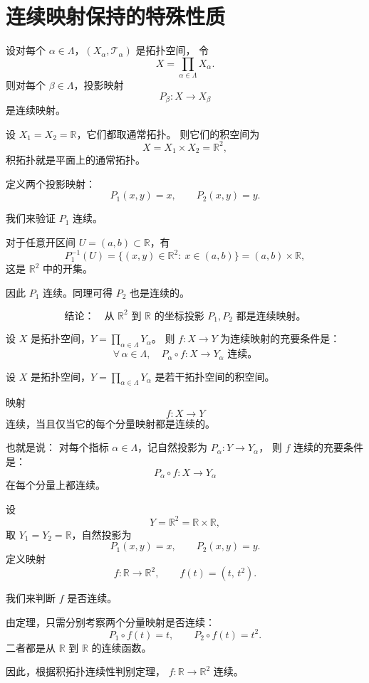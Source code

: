 \section{连续映射保持的特殊性质}
\begin{theorem}[积拓扑中的自然投影映射是连续的]
设对每个 \(\alpha\in\Lambda\)，\((X_\alpha,\mathcal{T}_\alpha)\) 是拓扑空间，
令
\[
X=\prod_{\alpha\in\Lambda}X_\alpha.
\]
则对每个 \(\beta\in\Lambda\)，投影映射
\[
P_\beta:X\to X_\beta
\]
是连续映射。
\end{theorem}
\begin{example}[投影映射的连续性举例]
设 \(X_1=X_2=\mathbb{R}\)，它们都取通常拓扑。  
则它们的积空间为
\[
X = X_1 \times X_2 = \mathbb{R}^2,
\]
积拓扑就是平面上的通常拓扑。

定义两个投影映射：
\[
P_1(x,y)=x,\qquad P_2(x,y)=y.
\]

我们来验证 \(P_1\) 连续。

对于任意开区间 \(U=(a,b)\subset\mathbb{R}\)，有
\[
P_1^{-1}(U)=\{(x,y)\in\mathbb{R}^2:\ x\in(a,b)\}=(a,b)\times\mathbb{R},
\]
这是 \(\mathbb{R}^2\) 中的开集。

因此 \(P_1\) 连续。同理可得 \(P_2\) 也是连续的。

\[
\boxed{\text{结论：}}\quad
\text{从 }\mathbb{R}^2\text{ 到 }\mathbb{R}\text{ 的坐标投影 }P_1,P_2\text{ 都是连续映射。}
\]
\end{example}
\begin{theorem}[积为连续的充要条件就是每一个分量都连续]
设 \(X\) 是拓扑空间，\(Y=\displaystyle\prod_{\alpha\in\Lambda}Y_\alpha\)。  
则 \(f:X\to Y\) 为连续映射的充要条件是：
\[
\forall\,\alpha\in\Lambda,\quad 
P_\alpha\circ f:X\to Y_\alpha \text{ 连续。}
\]
\end{theorem}
\begin{note}
    设 $X$ 是拓扑空间，$Y=\displaystyle\prod_{\alpha\in\Lambda}Y_\alpha$ 是若干拓扑空间的积空间。  

映射
\[
f:X\to Y
\]
连续，当且仅当它的每个分量映射都是连续的。  

也就是说：  
对每个指标 $\alpha\in\Lambda$，记自然投影为 $P_\alpha:Y\to Y_\alpha$，  
则 $f$ 连续的充要条件是：
\[
P_\alpha\circ f:X\to Y_\alpha
\]
在每个分量上都连续。
\end{note}
\begin{example}[积拓扑连续性判别的具体例子]
设
\[
Y=\mathbb{R}^2=\mathbb{R}\times\mathbb{R},
\]
取 $Y_1=Y_2=\mathbb{R}$，自然投影为
\[
P_1(x,y)=x,\qquad P_2(x,y)=y.
\]
定义映射
\[
f:\mathbb{R}\to\mathbb{R}^2,\qquad f(t)=(t,\,t^2).
\]

我们来判断 $f$ 是否连续。

由定理，只需分别考察两个分量映射是否连续：
\[
P_1\circ f(t)=t,\qquad P_2\circ f(t)=t^2.
\]
二者都是从 $\mathbb{R}$ 到 $\mathbb{R}$ 的连续函数。

因此，根据积拓扑连续性判别定理，  
$f:\mathbb{R}\to\mathbb{R}^2$ 连续。
\end{example}
